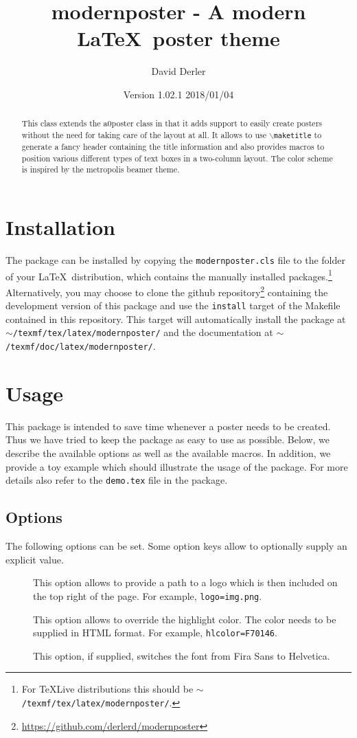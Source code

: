 \documentclass{article}
\title{modernposter - A modern \LaTeX~poster theme}
\author{David Derler}
\date{Version 1.02.1 2018/01/04}
\begin{document}
  \maketitle

  \begin{abstract}
\noindent This class extends the a0poster class in that it adds support to easily create posters without the need for taking care of the layout at all. It allows to use {\tt $\backslash$maketitle} to generate a fancy header containing the title information and also provides macros to position various different types of text boxes in a two-column layout. The color scheme  is inspired by the metropolis beamer theme.
  \end{abstract}
  \section{Installation}
  The package can be installed by copying the {\tt modernposter.cls} file to the folder of your \LaTeX~distribution, which contains the manually installed packages.\footnote{For TeXLive distributions this should be {\tt $\sim$/texmf/tex/latex/modernposter/}.} Alternatively, you may choose to clone the github repository\footnote{\url{https://github.com/derlerd/modernposter}} containing the development version of this package and use the {\tt install} target of the Makefile contained in this repository. This target will automatically install the package at {\tt $\sim$/texmf/tex/latex/modern\-poster/} and the documentation at {\tt $\sim$/texmf/doc/latex/modernposter/}.
  \section{Usage}
  This package is intended to save time whenever a poster needs to be created. Thus we have tried to keep the package as easy to use as possible. Below, we describe the available options as well as the available macros. In addition, we provide a toy example which should illustrate the usage of the package. For more details also refer to the {\tt demo.tex} file in the package.
  \subsection{Options}
  The following options can be set. Some option keys allow to optionally supply an explicit value.  
  \begin{description}
  	\item[] This option allows to provide a path to a logo which is then included on the top right of the page. For example, {\tt logo=img.png}.
  	\item[] This option allows to override the highlight color. The color needs to be supplied in HTML format. For example, {\tt hlcolor=F70146}. 
    \item[] This option, if supplied, switches the font from Fira Sans to Helvetica.
  \end{description}
\end{document}
